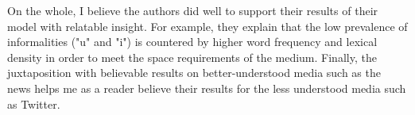 \documentclass[12pt]{article}
\begin{document}
On the whole, I believe the authors did well to support their results of their model with relatable insight. For example, they explain that the low prevalence of informalities ("u" and "i") is countered by higher word frequency and lexical density in order to meet the space requirements of the medium. Finally, the juxtaposition with believable results on better-understood media such as the news helps me as a reader believe their results for the less understood media such as Twitter.
\end{document}
